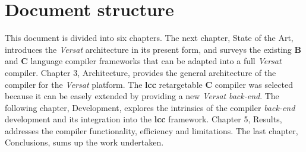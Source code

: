 \section{Document structure}
\label{section:parts}

This document is divided into six chapters.  The next chapter, State of the Art,
introduces the {\it Versat} architecture in its present form, and surveys the
existing {\bf B} and {\bf C} language compiler frameworks that can be adapted
into a full {\it Versat} compiler.  Chapter 3, Architecture, provides
the general architecture of the compiler for the {\it Versat}
platform.  The {\bf lcc} retargetable {\bf C} compiler was selected because
it can be easely extended by providing a new {\it Versat} {\it back-end}.
The following chapter, Development, explores the intrinsics of the
compiler {\it back-end} development and its integration into the {\bf lcc}
framework.  Chapter 5, Results, addresses the compiler functionality, efficiency
and limitations.  The last chapter, Conclusions, sums up the work undertaken.
